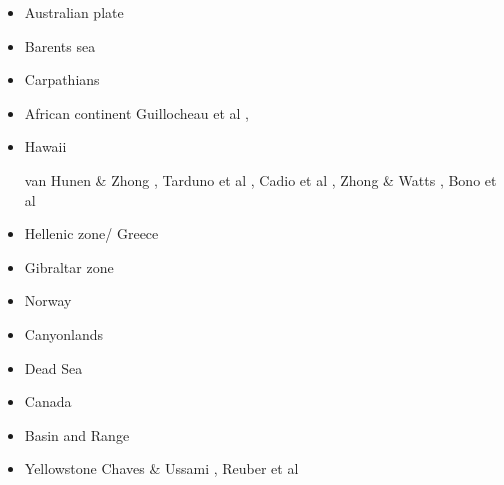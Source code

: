 \begin{itemize}
\item Australian plate 
{\scriptsize
\cite{himu03}\cite{wemv03}\cite{pymi03}\cite{onml03}
\cite{onmj05}
\cite{hazs10}\cite{dimg10}
\cite{mahg11}\cite{digm11}
\cite{gosk14}
\cite{scsp15}
}
\item Barents sea 
{\scriptsize
\cite{buto07b}
\cite{gahs13}
\cite{gahs14}
}
\item Carpathians 
{\scriptsize
\cite{clbm04}
\cite{isms05}
\cite{nehe06}
\cite{sepg19}
}
\item African continent 
{\scriptsize
\cite{gikb94}
\cite{vabt11}
\cite{busm12}
\cite{gagb14}
\cite{wakc17}
Guillocheau et al \cite{gusb18},
\cite{cels20}
}
\item Hawaii 
\begin{scriptsize}
van Hunen \& Zhong \cite{vazh03},
Tarduno et al \cite{tabs09},
Cadio et al \cite{cabp12},
Zhong \& Watts \cite{zhwa13},
Bono et al \cite{botb19}
\end{scriptsize}

\item Hellenic zone/ Greece  
{\scriptsize
\cite{spwv88}
\cite{guhf13}
\cite{olpr14}
}
\item Gibraltar zone 
{\scriptsize
\cite{gumr02}\cite{nebs02}
\cite{vanv08}
\cite{fufa10}
\cite{miab13}\cite{almb13}
\cite{medd15}\cite{furc15}
\cite{necf16}
\cite{casv19}
\cite{jitf19}
} 
\item Norway 
{\scriptsize
\cite{soma13}
\cite{bubj15}
}
\item Canyonlands 
{\scriptsize
\cite{trca94}
\cite{scwa02}
\cite{grsk03}
}
\item Dead Sea 
{\scriptsize
\cite{sopg05}
}
\item Canada 
{\scriptsize
\cite{brbw93}
\cite{pelj99}
}
\item Basin and Range 
{\scriptsize
\cite{brbe89c}
\cite{wefr09}
}
\item Yellowstone 
{\scriptsize
Chaves \& Ussami \cite{chus13},
Reuber et al \cite{rekp18}
}


\end{itemize}
